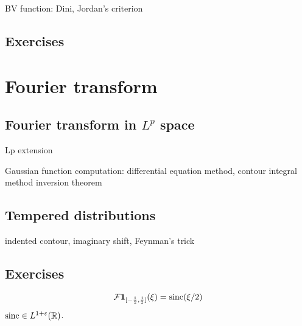 \documentclass{../../large}
\begin{document}
BV function: Dini, Jordan's criterion
\begin{prb}
\end{prb}


\section*{Exercises}
\begin{prb}
\end{prb}
\begin{prb}
\end{prb}









\chapter{Fourier transform}
\section{Fourier transform in $L^p$ space}
\begin{prb}
\end{prb}
Lp extension

Gaussian function computation: differential equation method, contour integral method
inversion theorem
\begin{prb}
\end{prb}

\section{Tempered distributions}
\begin{prb}
indented contour, imaginary shift, Feynman's trick
\end{prb}



\section*{Exercises}
\begin{prb}
\[\mathcal{F}\mathbf{1}_{[-\frac12,\frac12]}(\xi)=\operatorname{sinc}(\xi/2)\]
$\operatorname{sinc}\in L^{1+\varepsilon}(\mathbb{R})$.
\end{prb}
\begin{prb}
\end{prb}
\begin{prb}
\end{prb}
\end{document}
